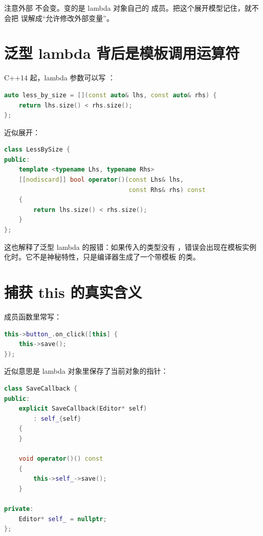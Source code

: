注意外部  不会变。变的是 lambda 对象自己的  成员。把这个展开模型记住，就不会把  误解成“允许修改外部变量”。

\section{泛型 lambda 背后是模板调用运算符}

C++14 起，lambda 参数可以写 ：

\begin{lstlisting}[language=C++,caption={泛型 lambda}]
auto less_by_size = [](const auto& lhs, const auto& rhs) {
    return lhs.size() < rhs.size();
};
\end{lstlisting}

近似展开：

\begin{lstlisting}[language=C++,caption={泛型 lambda 展开成模板调用运算符}]
class LessBySize {
public:
    template <typename Lhs, typename Rhs>
    [[nodiscard]] bool operator()(const Lhs& lhs,
                                  const Rhs& rhs) const
    {
        return lhs.size() < rhs.size();
    }
};
\end{lstlisting}

这也解释了泛型 lambda 的报错：如果传入的类型没有 ，错误会出现在模板实例化时。它不是神秘特性，只是编译器生成了一个带模板  的类。

\section{捕获 this 的真实含义}

成员函数里常写：

\begin{lstlisting}[language=C++,caption={捕获 this}]
this->button_.on_click([this] {
    this->save();
});
\end{lstlisting}

近似意思是 lambda 对象里保存了当前对象的指针：

\begin{lstlisting}[language=C++,caption={this 捕获近似展开}]
class SaveCallback {
public:
    explicit SaveCallback(Editor* self)
        : self_{self}
    {
    }

    void operator()() const
    {
        this->self_->save();
    }

private:
    Editor* self_ = nullptr;
};
\end{lstlisting}

